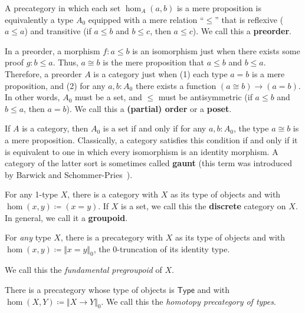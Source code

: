 \documentclass{amsart}
\newcommand{\defeq}{\coloneqq}  %
\newcommand{\type}{\ensuremath{\mathsf{Type}}\xspace}
\newcommand{\trunc}[2]{\Vert #2\Vert_{#1}}
\def\pizero{\trunc0}
\theoremstyle{definition}
\theoremstyle{remark}
\numberwithin{equation}{section}
\begin{document}
\begin{eg}\label{ct:orders}
  A precategory in which each set $\hom_A(a,b)$ is a mere proposition is equivalently a type $A_0$ equipped with a mere relation ``$\le$'' that is reflexive ($a\le a$) and transitive (if $a\le b$ and $b\le c$, then $a\le c$).
  We call this a \textbf{preorder}.

  In a preorder, a morphism $f\colon a\le b$ is an isomorphism just when there exists some proof $g\colon b\le a$.
  Thus, $a\cong b$ is the mere proposition that $a\le b$ and $b\le a$.
  Therefore, a preorder $A$ is a category just when (1) each type $a=b$ is a mere proposition, and (2) for any $a,b:A_0$ there exists a function $(a\cong b) \to (a=b)$.
  In other words, $A_0$ must be a set, and $\le$ must be antisymmetric (if $a\le b$ and $b\le a$, then $a=b$).
  We call this a \textbf{(partial) order} or a \textbf{poset}.
\end{eg}

\begin{eg}\label{ct:gaunt}
  If $A$ is a category, then $A_0$ is a set if and only if for any $a,b:A_0$, the type $a\cong b$ is a mere proposition.
  Classically, a category satisfies this condition if and only if it is equivalent to one in which every isomorphism is an identity morphism.
  A category of the latter sort is sometimes called \textbf{gaunt} (this term was introduced by Barwick and Schommer-Pries~\cite{bsp12infncats}).
\end{eg}

\begin{eg}\label{ct:discrete}
  For any 1-type $X$, there is a category with $X$ as its type of objects and with $\hom(x,y) \defeq (x=y)$.
  If $X$ is a set, we call this the \textbf{discrete} category on $X$.
  In general, we call it a \textbf{groupoid}.
\end{eg}

\begin{eg}\label{ct:fundgpd}
  For \emph{any} type $X$, there is a precategory with $X$ as its type of objects and with $\hom(x,y) \defeq \pizero{x=y}$, the 0-truncation of its identity type.



  We call this the \emph{fundamental pregroupoid} of $X$.
\end{eg}

\begin{eg}\label{ct:hoprecat}
  There is a precategory whose type of objects is \type and with $\hom(X,Y) \defeq \pizero{X\to Y}$.
  We call this the \emph{homotopy precategory of types}.
\end{eg}
\end{document}
